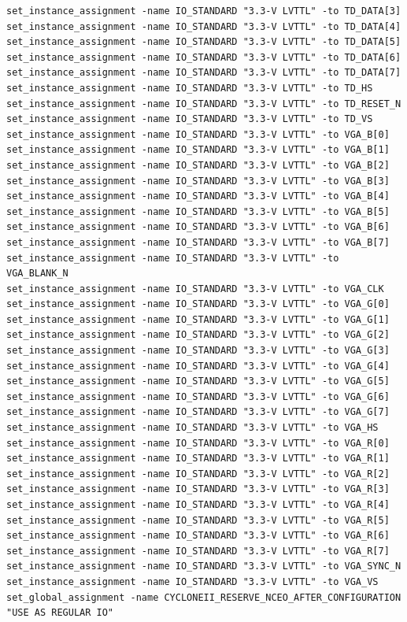 \documentclass[conference]{IEEEtran}
\begin{document}
\begin{lstlisting}
set_instance_assignment -name IO_STANDARD "3.3-V LVTTL" -to TD_DATA[3]
set_instance_assignment -name IO_STANDARD "3.3-V LVTTL" -to TD_DATA[4]
set_instance_assignment -name IO_STANDARD "3.3-V LVTTL" -to TD_DATA[5]
set_instance_assignment -name IO_STANDARD "3.3-V LVTTL" -to TD_DATA[6]
set_instance_assignment -name IO_STANDARD "3.3-V LVTTL" -to TD_DATA[7]
set_instance_assignment -name IO_STANDARD "3.3-V LVTTL" -to TD_HS
set_instance_assignment -name IO_STANDARD "3.3-V LVTTL" -to TD_RESET_N
set_instance_assignment -name IO_STANDARD "3.3-V LVTTL" -to TD_VS
set_instance_assignment -name IO_STANDARD "3.3-V LVTTL" -to VGA_B[0]
set_instance_assignment -name IO_STANDARD "3.3-V LVTTL" -to VGA_B[1]
set_instance_assignment -name IO_STANDARD "3.3-V LVTTL" -to VGA_B[2]
set_instance_assignment -name IO_STANDARD "3.3-V LVTTL" -to VGA_B[3]
set_instance_assignment -name IO_STANDARD "3.3-V LVTTL" -to VGA_B[4]
set_instance_assignment -name IO_STANDARD "3.3-V LVTTL" -to VGA_B[5]
set_instance_assignment -name IO_STANDARD "3.3-V LVTTL" -to VGA_B[6]
set_instance_assignment -name IO_STANDARD "3.3-V LVTTL" -to VGA_B[7]
set_instance_assignment -name IO_STANDARD "3.3-V LVTTL" -to VGA_BLANK_N
set_instance_assignment -name IO_STANDARD "3.3-V LVTTL" -to VGA_CLK
set_instance_assignment -name IO_STANDARD "3.3-V LVTTL" -to VGA_G[0]
set_instance_assignment -name IO_STANDARD "3.3-V LVTTL" -to VGA_G[1]
set_instance_assignment -name IO_STANDARD "3.3-V LVTTL" -to VGA_G[2]
set_instance_assignment -name IO_STANDARD "3.3-V LVTTL" -to VGA_G[3]
set_instance_assignment -name IO_STANDARD "3.3-V LVTTL" -to VGA_G[4]
set_instance_assignment -name IO_STANDARD "3.3-V LVTTL" -to VGA_G[5]
set_instance_assignment -name IO_STANDARD "3.3-V LVTTL" -to VGA_G[6]
set_instance_assignment -name IO_STANDARD "3.3-V LVTTL" -to VGA_G[7]
set_instance_assignment -name IO_STANDARD "3.3-V LVTTL" -to VGA_HS
set_instance_assignment -name IO_STANDARD "3.3-V LVTTL" -to VGA_R[0]
set_instance_assignment -name IO_STANDARD "3.3-V LVTTL" -to VGA_R[1]
set_instance_assignment -name IO_STANDARD "3.3-V LVTTL" -to VGA_R[2]
set_instance_assignment -name IO_STANDARD "3.3-V LVTTL" -to VGA_R[3]
set_instance_assignment -name IO_STANDARD "3.3-V LVTTL" -to VGA_R[4]
set_instance_assignment -name IO_STANDARD "3.3-V LVTTL" -to VGA_R[5]
set_instance_assignment -name IO_STANDARD "3.3-V LVTTL" -to VGA_R[6]
set_instance_assignment -name IO_STANDARD "3.3-V LVTTL" -to VGA_R[7]
set_instance_assignment -name IO_STANDARD "3.3-V LVTTL" -to VGA_SYNC_N
set_instance_assignment -name IO_STANDARD "3.3-V LVTTL" -to VGA_VS
set_global_assignment -name CYCLONEII_RESERVE_NCEO_AFTER_CONFIGURATION "USE AS REGULAR IO"

\end{lstlisting}
\end{document}

